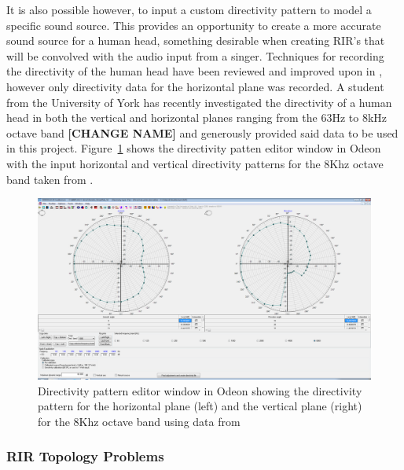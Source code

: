 \documentclass[../../main.tex]{subfiles}
\begin{document}
				It is also possible however, to input a custom directivity pattern to model a specific sound source. This provides an opportunity to create a more accurate sound source for a human head, something desirable when creating \ac{RIR}'s that will be convolved with the audio input from a singer. Techniques for recording the directivity of the human head have been reviewed and improved upon in \cite{Monson2012b}, however only directivity data for the horizontal plane was recorded. A student from the University of York has recently investigated the directivity of a human head in both the vertical and horizontal planes ranging from the 63Hz to 8kHz octave band \cite{calum} \textbf{[CHANGE NAME]} and generously provided said data to be used in this project. Figure~\ref{directivity} shows the directivity patten editor window in Odeon with the input horizontal and vertical directivity patterns for the 8Khz octave band taken from \cite{calum}. 


				\begin{figure}[H]
					\center\includegraphics[scale = 0.3]{Sections/Implementation/Odeon/images/Directivity/DirectivityPattern.png}
					\caption{Directivity pattern editor window in Odeon showing the directivity pattern for the horizontal plane (left) and the vertical plane (right) for the 8Khz octave band using data from \cite{calum}}
					\label{directivity}
				\end{figure}


		\subsubsection{RIR Topology Problems}
		\label{odeonError}
\end{document}
